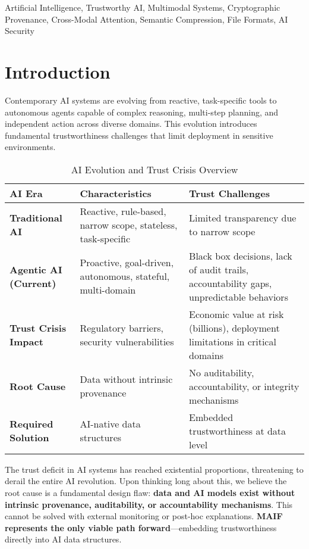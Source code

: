 \documentclass[conference]{IEEEtran}
\begin{document}
\begin{IEEEkeywords}
Artificial Intelligence, Trustworthy AI, Multimodal Systems, Cryptographic Provenance, Cross-Modal Attention, Semantic Compression, File Formats, AI Security
\end{IEEEkeywords}

\section{Introduction}

Contemporary AI systems are evolving from reactive, task-specific tools to autonomous agents capable of complex reasoning, multi-step planning, and independent action across diverse domains. This evolution introduces fundamental trustworthiness challenges that limit deployment in sensitive environments.

\begin{table*}[!t]
\renewcommand{\arraystretch}{1.3}
\caption{AI Evolution and Trust Crisis Overview}
\label{tab:ai-evolution-crisis}
\centering
\footnotesize
\begin{tabular}{p{3cm}p{5cm}p{6cm}}
\toprule
\textbf{AI Era} & \textbf{Characteristics} & \textbf{Trust Challenges} \\
\midrule
\textbf{Traditional AI} & Reactive, rule-based, narrow scope, stateless, task-specific & Limited transparency due to narrow scope \\
\textbf{Agentic AI (Current)} & Proactive, goal-driven, autonomous, stateful, multi-domain & Black box decisions, lack of audit trails, accountability gaps, unpredictable behaviors \\
\textbf{Trust Crisis Impact} & Regulatory barriers, security vulnerabilities & Economic value at risk (billions), deployment limitations in critical domains \\
\textbf{Root Cause} & Data without intrinsic provenance & No auditability, accountability, or integrity mechanisms \\
\textbf{Required Solution} & AI-native data structures & Embedded trustworthiness at data level \\
\bottomrule
\end{tabular}
\end{table*}

The trust deficit in AI systems has reached existential proportions, threatening to derail the entire AI revolution. Upon thinking long about this, we believe the root cause is a fundamental design flaw: \textbf{data and AI models exist without intrinsic provenance, auditability, or accountability mechanisms}. This cannot be solved with external monitoring or post-hoc explanations. \textbf{MAIF represents the only viable path forward}—embedding trustworthiness directly into AI data structures.
\end{document}
